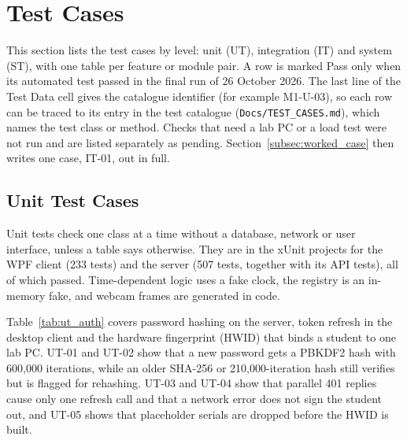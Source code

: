 \section{Test Cases}\label{sec:test_cases}

This section lists the test cases by level: unit (UT), integration (IT) and system (ST), with one table per feature or module pair. A row is marked Pass only when its automated test passed in the final run of 26 October 2026. The last line of the Test Data cell gives the catalogue identifier (for example M1-U-03), so each row can be traced to its entry in the test catalogue (\texttt{Docs/\allowbreak{}TEST\_CASES.md}), which names the test class or method. Checks that need a lab PC or a load test were not run and are listed separately as pending. Section~\ref{subsec:worked_case} then writes one case, IT-01, out in full.

\subsection{Unit Test Cases}\label{subsec:unit_tests}

Unit tests check one class at a time without a database, network or user interface, unless a table says otherwise. They are in the xUnit projects for the WPF client (233 tests) and the server (507 tests, together with its API tests), all of which passed. Time-dependent logic uses a fake clock, the registry is an in-memory fake, and webcam frames are generated in code.

Table~\ref{tab:ut_auth} covers password hashing on the server, token refresh in the desktop client and the hardware fingerprint (HWID) that binds a student to one lab PC. UT-01 and UT-02 show that a new password gets a PBKDF2 hash with 600,000 iterations, while an older SHA-256 or 210,000-iteration hash still verifies but is flagged for rehashing. UT-03 and UT-04 show that parallel 401 replies cause only one refresh call and that a network error does not sign the student out, and UT-05 shows that placeholder serials are dropped before the HWID is built.

